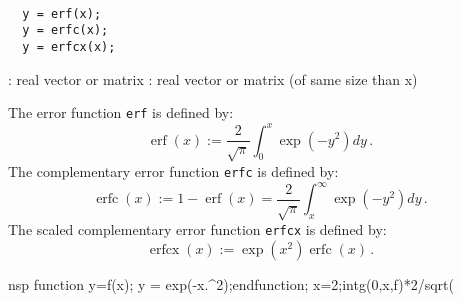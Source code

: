 \begin{mandesc}
  \\
  \\
  \\
\end{mandesc}
\begin{calling_sequence}
\begin{verbatim}
  y = erf(x);
  y = erfc(x);  
  y = erfcx(x);  
\end{verbatim}
\end{calling_sequence}
\begin{parameters}
  \begin{varlist}
    : real vector or matrix
    : real vector or matrix (of same size than x)
  \end{varlist}
\end{parameters}

\begin{mandescription}
  The error function \verb+erf+ is defined by:
\[
  \operatorname{erf}(x) :=\frac{2}{\sqrt{\pi}} \int_0^x \exp(-y^2) dy \,.
\]
  The complementary error function \verb+erfc+ is defined by:
\[
\operatorname{erfc}(x) := 1 - \operatorname{erf}(x) = \frac{2}{\sqrt{\pi}} \int_x^{\infty} \exp(-y^2)dy \,.
\]
The scaled complementary error function \verb+erfcx+ is defined by:
\[
\operatorname{erfcx}(x) := \exp(x^2) \operatorname{erfc}(x)\,.
\]
\end{mandescription}

\begin{examples}
\begin{mintednsp}{nsp}
  function y=f(x); y = exp(-x.^2);endfunction;
  x=2;intg(0,x,f)*2/sqrt(%
\end{mintednsp}
\end{examples}

